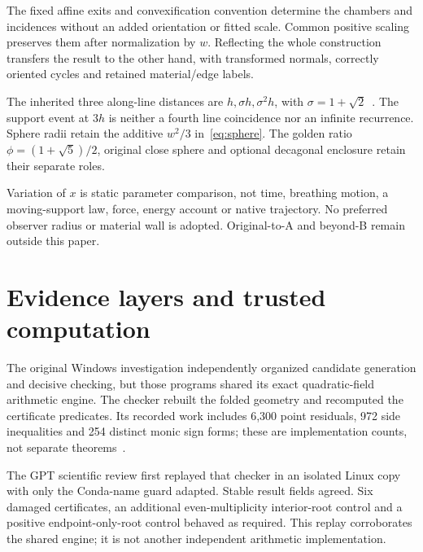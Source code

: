 \documentclass[11pt,a4paper]{article}
\theoremstyle{definition}
\begin{document}
The fixed affine exits and convexification convention determine the chambers and incidences without an added orientation or fitted scale. Common positive scaling preserves them after normalization by $w$. Reflecting the whole construction transfers the result to the other hand, with transformed normals, correctly oriented cycles and retained material/edge labels.

The inherited three along-line distances are $h,\sigma h,\sigma^2h$, with $\sigma=1+\sqrt2$~\cite[Corollary on the finite three-term relation]{parent}. The support event at $3h$ is neither a fourth line coincidence nor an infinite recurrence. Sphere radii retain the additive $w^2/3$ in~\eqref{eq:sphere}. The golden ratio $\phi=(1+\sqrt5)/2$, original close sphere and optional decagonal enclosure retain their separate roles.

Variation of $x$ is static parameter comparison, not time, breathing motion, a moving-support law, force, energy account or native trajectory. No preferred observer radius or material wall is adopted. Original-to-A and beyond-B remain outside this paper.

\section{Evidence layers and trusted computation}\label{sec:evidence}
The original Windows investigation independently organized candidate generation and decisive checking, but those programs shared its exact quadratic-field arithmetic engine. The checker rebuilt the folded geometry and recomputed the certificate predicates. Its recorded work includes 6,300 point residuals, 972 side inequalities and 254 distinct monic sign forms; these are implementation counts, not separate theorems~\cite{investigation}.

The GPT scientific review first replayed that checker in an isolated Linux copy with only the Conda-name guard adapted. Stable result fields agreed. Six damaged certificates, an additional even-multiplicity interior-root control and a positive endpoint-only-root control behaved as required. This replay corroborates the shared engine; it is not another independent arithmetic implementation.
\end{document}
